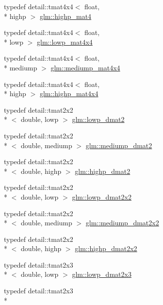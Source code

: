 \begin{DoxyCompactItemize}
typedef detail\-::tmat4x4$<$ float, \\*
highp $>$ \hyperlink{group__core__precision_ga3067b3b8ce793227a51b2e3c233257d5}{glm\-::highp\-\_\-mat4}
\item 
typedef detail\-::tmat4x4$<$ float, \\*
lowp $>$ \hyperlink{group__core__precision_gad31846a0565c22a0479950313c28b218}{glm\-::lowp\-\_\-mat4x4}
\item 
typedef detail\-::tmat4x4$<$ float, \\*
mediump $>$ \hyperlink{group__core__precision_gacb51d2d10f7607617ac544f6db9a6eef}{glm\-::mediump\-\_\-mat4x4}
\item 
typedef detail\-::tmat4x4$<$ float, \\*
highp $>$ \hyperlink{group__core__precision_ga231950d260be295a25d7340e2020f55c}{glm\-::highp\-\_\-mat4x4}
\item 
typedef detail\-::tmat2x2\\*
$<$ double, lowp $>$ \hyperlink{group__core__precision_ga5e08c45dfef867e0326a1eee95060cd0}{glm\-::lowp\-\_\-dmat2}
\item 
typedef detail\-::tmat2x2\\*
$<$ double, mediump $>$ \hyperlink{group__core__precision_gac056ec9d1c37e591172544088163b7e4}{glm\-::mediump\-\_\-dmat2}
\item 
typedef detail\-::tmat2x2\\*
$<$ double, highp $>$ \hyperlink{group__core__precision_ga9b158b3b722fe991bb66f7e65f136e68}{glm\-::highp\-\_\-dmat2}
\item 
typedef detail\-::tmat2x2\\*
$<$ double, lowp $>$ \hyperlink{group__core__precision_ga68b486ff22814c1a3781378513a9fcc0}{glm\-::lowp\-\_\-dmat2x2}
\item 
typedef detail\-::tmat2x2\\*
$<$ double, mediump $>$ \hyperlink{group__core__precision_ga88ddb4188060ab00fee67c9840f4417e}{glm\-::mediump\-\_\-dmat2x2}
\item 
typedef detail\-::tmat2x2\\*
$<$ double, highp $>$ \hyperlink{group__core__precision_gaa5e35f6570d394c1cd34f411a473220c}{glm\-::highp\-\_\-dmat2x2}
\item 
typedef detail\-::tmat2x3\\*
$<$ double, lowp $>$ \hyperlink{group__core__precision_ga2c7432984a35cf72050870a54485ef35}{glm\-::lowp\-\_\-dmat2x3}
\item 
typedef detail\-::tmat2x3\\*

\end{DoxyCompactItemize}
